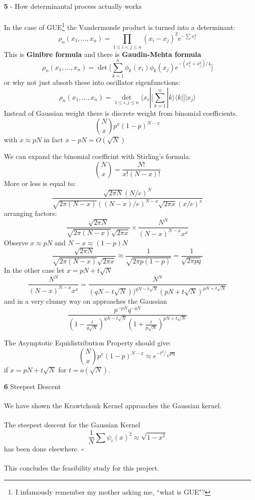 \documentclass[12pt]{article}
\begin{document}
\newpage

\noindent \textbf{5} - How determinantal process actually works \\ \\
In the case of GUE\footnote{I infamously remember my mother asking me, ``what is GUE"?} the Vandermonde product is turned into a determinant:
$$ \rho_n(x_1, \dots, x_n) = \prod_{1 \leq i < j \leq n} (x_i - x_j)^2 e^{- \sum x_i^2 } $$
This is \textbf{Ginibre formula} and there is \textbf{Gaudin-Mehta formula}
$$\rho_n(x_1, \dots, x_n) = \det \bigg[ \sum_{k=1}^n \phi_k(x_i) \phi_k(x_j) e^{-(x_i^2 + x_j^2)/4}\bigg] $$
or why not just absorb these into oscillator eigenfunctions:
$$ \rho_n(x_1, \dots, x_n) 
=  \det_{1 \leq i,j\leq n} \langle x_i | \bigg[ \sum_{k=1}^n  |k \rangle \langle k |  \bigg] | x_j \rangle $$
Instead of Gaussian weight there is discrete weight from binomial coefficients.
$$ \binom{N}{x} p^x (1-p)^{N-x} 
 $$
with $x \approx pN$ in fact $x - pN = O(\sqrt{N})$

\newpage

We can expand the binomial coefficint with Stirling's formula:
$$ 
\binom{N}{x}
= \frac{N!}{ x! (N-x)!}
$$
More or less is equal to:
$$\frac{ \sqrt{2\pi N}(N/e)^N}{
\sqrt{2\pi (N-x)}((N-x)/e)^{N-x}
\sqrt{2\pi x}(x/e)^x
}
$$
arranging factors:
$$  \frac{\sqrt{2\pi N}}{\sqrt{2\pi (N-x)}\sqrt{2\pi x}} \times \frac{ N^N}{(N-x)^{N-x}x^x}$$
Observe $x \approx pN$ and $N-x \approx (1-p)N$
$$ \frac{\sqrt{2\pi N}}{\sqrt{2\pi (N-x)}\sqrt{2\pi x}} \approx \frac{1}{\sqrt{2\pi p(1-p)}}=
\frac{1}{\sqrt{2\pi pq}}
$$
In the other case let $ x = pN + t\sqrt{N}$
$$ \frac{ N^N}{(N-x)^{N-x}x^x}
= \frac{ N^N}{(qN - t\sqrt{N}))^{qN - t\sqrt{N}}(pN + t\sqrt{N})^{pN + t\sqrt{N}}}$$
and in a very clumsy way on approaches the Gaussian
$$ \frac{p^{-pN}q^{-qN}}{(1 - \frac{t}{q\sqrt{N}}
)^{qN - t\sqrt{N}}(1 + \frac{t}{p\sqrt{N}})^{pN + t\sqrt{N}}}$$

\newpage

\noindent The Asymptotic Equidistribution Property should give:
$$ 
\binom{N}{x} p^x (1-p)^{N-x} 
\approx e^{- t^2/\sqrt{pq}}
$$
if $x = pN + t \sqrt{N}$ for $t = o(\sqrt{N})$.

\newpage

\noindent \textbf{6} Steepest Descent \\ \\
We have shown the Krawtchouk Kernel approaches the Gaussian kernel. \\ \\
The steepest descent for the Gaussian Kernel
$$ \frac{1}{N}\sum \psi_i(x)^2 \approx \sqrt{1 - x^2} $$
has been done elsewhere. \hfill $\square$ \\ \\ 
This concludes the feasibility study for this project.  
\end{document}
